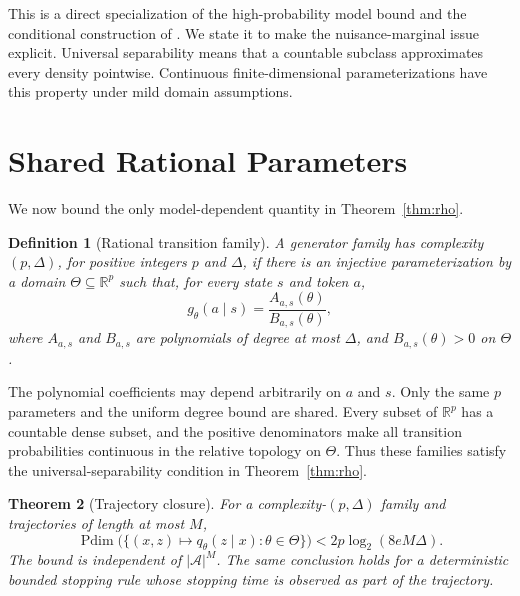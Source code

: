 \documentclass[twoside]{article}
\newtheorem{theorem}{Theorem}
\newtheorem{definition}[theorem]{Definition}
\newcommand{\A}{\mathcal A}
\newcommand{\R}{\mathbb R}
\newcommand{\Pdim}{\operatorname{Pdim}}
\begin{document}
This is a direct specialization of the high-probability model bound and the conditional construction of \citet{baraud2018}. We state it to make the nuisance-marginal issue explicit. Universal separability means that a countable subclass approximates every density pointwise. Continuous finite-dimensional parameterizations have this property under mild domain assumptions.

\section{Shared Rational Parameters}
\label{sec:rational}

We now bound the only model-dependent quantity in Theorem~\ref{thm:rho}.

\begin{definition}[Rational transition family]
\label{def:rational}
A generator family has complexity $(p,\Delta)$, for positive integers $p$ and $\Delta$, if there is an injective parameterization by a domain $\Theta\subseteq\R^p$ such that, for every state $s$ and token $a$, \[ g_\theta(a\mid s)=\frac{A_{a,s}(\theta)}{B_{a,s}(\theta)}, \] where $A_{a,s}$ and $B_{a,s}$ are polynomials of degree at most $\Delta$, and $B_{a,s}(\theta)>0$ on $\Theta$.
\end{definition}

The polynomial coefficients may depend arbitrarily on $a$ and $s$. Only the same $p$ parameters and the uniform degree bound are shared. Every subset of $\R^p$ has a countable dense subset, and the positive denominators make all transition probabilities continuous in the relative topology on $\Theta$. Thus these families satisfy the universal-separability condition in Theorem~\ref{thm:rho}.

\begin{theorem}[Trajectory closure]
\label{thm:closure}
For a complexity-$(p,\Delta)$ family and trajectories of length at most $M$,
\begin{equation}
 \Pdim\bigl(\{(x,z)\mapsto q_\theta(z\mid x):\theta\in\Theta\}\bigr)
 <2p\log_2(8eM\Delta).
 \label{eq:pdim-bound}
\end{equation}
The bound is independent of $|\A|^M$. The same conclusion holds for a deterministic bounded stopping rule whose stopping time is observed as part of the trajectory.
\end{theorem}
\end{document}
